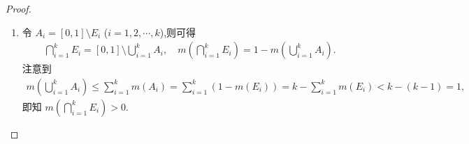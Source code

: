 \documentclass[../../main.tex]{subfiles}%
\begin{document}
\begin{proof}
\begin{enumerate}[(1)]
若$\mathring{E}\neq \varnothing$,设$x_0\in \mathring{E}$,则存在$\delta>0$,使得$B(x_0,\delta)\subseteq E$.于是$0<2\delta=m(B(x_0,\delta))\leqslant m(E)=0$,矛盾!

\item 令 $A_i=[0,1]\setminus E_i$ ($i=1,2,\cdots,k$),则可得
\begin{align*}
\bigcap\limits_{i=1}^{k}E_i=[0,1]\setminus\bigcup\limits_{i=1}^{k}A_i,\quad m\left(\bigcap\limits_{i=1}^{k}E_i\right)=1-m\left(\bigcup\limits_{i=1}^{k}A_i\right).
\end{align*}
注意到
\begin{align*}
m\left(\bigcup\limits_{i=1}^{k}A_i\right)\leqslant\sum\limits_{i=1}^{k}m(A_i)=\sum\limits_{i=1}^{k}(1-m(E_i))
=k-\sum\limits_{i=1}^{k}m(E_i)<k-(k-1)=1,
\end{align*}
即知 $m\left(\bigcap\limits_{i=1}^{k}E_i\right)>0$.
\end{enumerate}

\end{proof}
\end{document}
